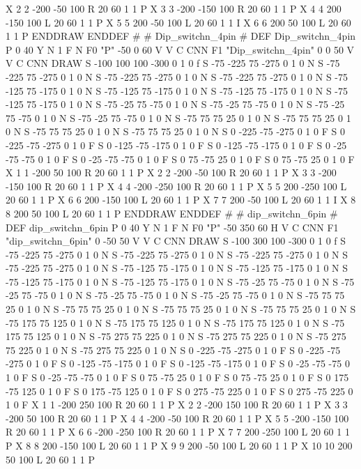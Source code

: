 X 2 2 -200 -50 100 R 20 60 1 1 P
X 3 3 -200 -150 100 R 20 60 1 1 P
X 4 4 200 -150 100 L 20 60 1 1 P
X 5 5 200 -50 100 L 20 60 1 1 I
X 6 6 200 50 100 L 20 60 1 1 P
ENDDRAW
ENDDEF
#
# Dip_switchn_4pin
#
DEF Dip_switchn_4pin P 0 40 Y N 1 F N
F0 "P" -50 0 60 V V C CNN
F1 "Dip_switchn_4pin" 0 0 50 V V C CNN
DRAW
S -100 100 100 -300 0 1 0 f
S -75 -225 75 -275 0 1 0 N
S -75 -225 75 -275 0 1 0 N
S -75 -225 75 -275 0 1 0 N
S -75 -225 75 -275 0 1 0 N
S -75 -125 75 -175 0 1 0 N
S -75 -125 75 -175 0 1 0 N
S -75 -125 75 -175 0 1 0 N
S -75 -125 75 -175 0 1 0 N
S -75 -25 75 -75 0 1 0 N
S -75 -25 75 -75 0 1 0 N
S -75 -25 75 -75 0 1 0 N
S -75 -25 75 -75 0 1 0 N
S -75 75 75 25 0 1 0 N
S -75 75 75 25 0 1 0 N
S -75 75 75 25 0 1 0 N
S -75 75 75 25 0 1 0 N
S 0 -225 -75 -275 0 1 0 F
S 0 -225 -75 -275 0 1 0 F
S 0 -125 -75 -175 0 1 0 F
S 0 -125 -75 -175 0 1 0 F
S 0 -25 -75 -75 0 1 0 F
S 0 -25 -75 -75 0 1 0 F
S 0 75 -75 25 0 1 0 F
S 0 75 -75 25 0 1 0 F
X 1 1 -200 50 100 R 20 60 1 1 P
X 2 2 -200 -50 100 R 20 60 1 1 P
X 3 3 -200 -150 100 R 20 60 1 1 P
X 4 4 -200 -250 100 R 20 60 1 1 P
X 5 5 200 -250 100 L 20 60 1 1 P
X 6 6 200 -150 100 L 20 60 1 1 P
X 7 7 200 -50 100 L 20 60 1 1 I
X 8 8 200 50 100 L 20 60 1 1 P
ENDDRAW
ENDDEF
#
# dip_switchn_6pin
#
DEF dip_switchn_6pin P 0 40 Y N 1 F N
F0 "P" -50 350 60 H V C CNN
F1 "dip_switchn_6pin" 0 -50 50 V V C CNN
DRAW
S -100 300 100 -300 0 1 0 f
S -75 -225 75 -275 0 1 0 N
S -75 -225 75 -275 0 1 0 N
S -75 -225 75 -275 0 1 0 N
S -75 -225 75 -275 0 1 0 N
S -75 -125 75 -175 0 1 0 N
S -75 -125 75 -175 0 1 0 N
S -75 -125 75 -175 0 1 0 N
S -75 -125 75 -175 0 1 0 N
S -75 -25 75 -75 0 1 0 N
S -75 -25 75 -75 0 1 0 N
S -75 -25 75 -75 0 1 0 N
S -75 -25 75 -75 0 1 0 N
S -75 75 75 25 0 1 0 N
S -75 75 75 25 0 1 0 N
S -75 75 75 25 0 1 0 N
S -75 75 75 25 0 1 0 N
S -75 175 75 125 0 1 0 N
S -75 175 75 125 0 1 0 N
S -75 175 75 125 0 1 0 N
S -75 175 75 125 0 1 0 N
S -75 275 75 225 0 1 0 N
S -75 275 75 225 0 1 0 N
S -75 275 75 225 0 1 0 N
S -75 275 75 225 0 1 0 N
S 0 -225 -75 -275 0 1 0 F
S 0 -225 -75 -275 0 1 0 F
S 0 -125 -75 -175 0 1 0 F
S 0 -125 -75 -175 0 1 0 F
S 0 -25 -75 -75 0 1 0 F
S 0 -25 -75 -75 0 1 0 F
S 0 75 -75 25 0 1 0 F
S 0 75 -75 25 0 1 0 F
S 0 175 -75 125 0 1 0 F
S 0 175 -75 125 0 1 0 F
S 0 275 -75 225 0 1 0 F
S 0 275 -75 225 0 1 0 F
X 1 1 -200 250 100 R 20 60 1 1 P
X 2 2 -200 150 100 R 20 60 1 1 P
X 3 3 -200 50 100 R 20 60 1 1 P
X 4 4 -200 -50 100 R 20 60 1 1 P
X 5 5 -200 -150 100 R 20 60 1 1 P
X 6 6 -200 -250 100 R 20 60 1 1 P
X 7 7 200 -250 100 L 20 60 1 1 P
X 8 8 200 -150 100 L 20 60 1 1 P
X 9 9 200 -50 100 L 20 60 1 1 P
X 10 10 200 50 100 L 20 60 1 1 P
